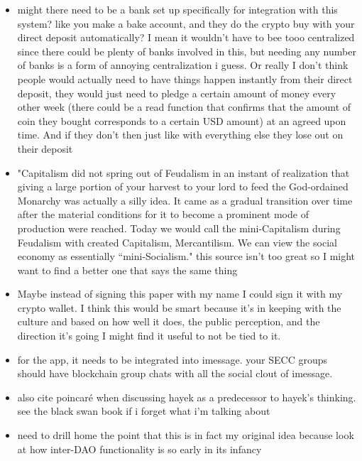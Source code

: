 \documentclass{article}[10pt]
\begin{document}
\begin{itemize}
    \item might there need to be a bank set up specifically for integration with this system? 
    like you make a bake account, and they do the crypto buy with your direct deposit automatically? 
    I mean it wouldn't have to bee tooo centralized since there could be plenty of banks involved in this, but needing any number of banks is a form of annoying centralization i guess. 
    Or really I don't think people would actually need to have things happen instantly from their direct deposit, they would just need to pledge a certain amount of money every other week (there could be a read function that confirms that the amount of coin they bought corresponds to a certain USD amount) at an agreed upon time. 
    And if they don't then just like with everything else they lose out on their deposit
    
    \item "Capitalism did not spring out of Feudalism in an instant of realization that giving a large portion of your harvest to your lord to feed the God-ordained Monarchy was actually a silly idea. 
    It came as a gradual transition over time after the material conditions for it to become a prominent mode of production were reached. 
    Today we would call the mini-Capitalism during Feudalism with created Capitalism, Mercantilism. 
    We can view the social economy as essentially “mini-Socialism."\autocite{blockchain101} 
    this source isn't too great so I might want to find a better one that says the same thing

    \item Maybe instead of signing this paper with my name I could sign it with my crypto wallet. 
    I think this would be smart because it’s in keeping with the culture and based on how well it does, the public perception, and the direction it’s going I might find it useful to not be tied to it.
    
    \item for the app, it needs to be integrated into imessage. 
    your SECC groups should have blockchain group chats with all the social clout of imessage.
    
    \item also cite poincaré when discussing hayek as a predecessor to hayek’s thinking. 
    see the black swan book if i forget what i'm talking about

    \item need to drill home the point that this is in fact my original idea because look at how inter-DAO functionality is so early in its infancy 


\end{itemize}
\end{document}
